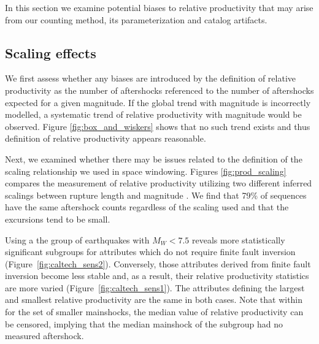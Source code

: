 \documentclass[draft]{agujournal}
\begin{document}
In this section we  examine potential biases to relative productivity that may arise from our counting method, its parameterization and catalog artifacts.

\subsection{Scaling effects}\label{sec:scaling}

We first assess whether any biases are introduced by the definition of relative productivity as the number of aftershocks referenced to the number of aftershocks expected for a given magnitude. If the global trend with magnitude is incorrectly modelled, a systematic trend of relative productivity with magnitude would be observed. Figure \ref{fig:box_and_wiskers} shows that no such trend exists and thus definition of relative productivity appears reasonable.

Next, we examined whether there may be issues related to the definition of the scaling relationship we used in space windowing. Figures \ref{fig:prod_scaling} compares the measurement of relative productivity utilizing two different inferred scalings between rupture length and magnitude \citep{Brengman2019EarthquakeScalingDistributions,Wells1994}.   We find that 79\% of sequences have the same aftershock counts regardless of the scaling used and that the excursions tend to be small.

Using a the group of earthquakes with $M_W<7.5$ reveals more statistically significant subgroups for attributes which do not require finite fault inversion (Figure~\ref{fig:caltech_sens2}). Conversely, those attributes derived from finite fault inversion become less stable and, as a result, their relative productivity statistics are more varied (Figure~\ref{fig:caltech_sens1}). The attributes defining the largest and smallest relative productivity are the same in both cases.  Note that within for the set of smaller mainshocks, the median value of relative productivity can be censored, implying that the median mainshock of the subgroup had no measured aftershock.
\end{document}
